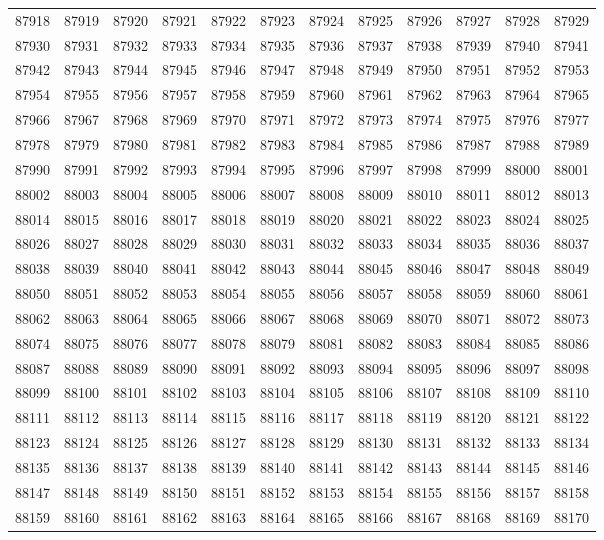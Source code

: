 \begin{center}
\begin{longtable}{llllllllllll}
87918 &87919 &87920 &87921 &87922 &87923 &87924 &87925 &87926 &87927 &87928 &87929 \\
87930 &87931 &87932 &87933 &87934 &87935 &87936 &87937 &87938 &87939 &87940 &87941 \\
87942 &87943 &87944 &87945 &87946 &87947 &87948 &87949 &87950 &87951 &87952 &87953 \\
87954 &87955 &87956 &87957 &87958 &87959 &87960 &87961 &87962 &87963 &87964 &87965 \\
87966 &87967 &87968 &87969 &87970 &87971 &87972 &87973 &87974 &87975 &87976 &87977 \\
87978 &87979 &87980 &87981 &87982 &87983 &87984 &87985 &87986 &87987 &87988 &87989 \\
87990 &87991 &87992 &87993 &87994 &87995 &87996 &87997 &87998 &87999 &88000 &88001 \\
88002 &88003 &88004 &88005 &88006 &88007 &88008 &88009 &88010 &88011 &88012 &88013 \\
88014 &88015 &88016 &88017 &88018 &88019 &88020 &88021 &88022 &88023 &88024 &88025 \\
88026 &88027 &88028 &88029 &88030 &88031 &88032 &88033 &88034 &88035 &88036 &88037 \\
88038 &88039 &88040 &88041 &88042 &88043 &88044 &88045 &88046 &88047 &88048 &88049 \\
88050 &88051 &88052 &88053 &88054 &88055 &88056 &88057 &88058 &88059 &88060 &88061 \\
88062 &88063 &88064 &88065 &88066 &88067 &88068 &88069 &88070 &88071 &88072 &88073 \\
88074 &88075 &88076 &88077 &88078 &88079 &88081 &88082 &88083 &88084 &88085 &88086 \\
88087 &88088 &88089 &88090 &88091 &88092 &88093 &88094 &88095 &88096 &88097 &88098 \\
88099 &88100 &88101 &88102 &88103 &88104 &88105 &88106 &88107 &88108 &88109 &88110 \\
88111 &88112 &88113 &88114 &88115 &88116 &88117 &88118 &88119 &88120 &88121 &88122 \\
88123 &88124 &88125 &88126 &88127 &88128 &88129 &88130 &88131 &88132 &88133 &88134 \\
88135 &88136 &88137 &88138 &88139 &88140 &88141 &88142 &88143 &88144 &88145 &88146 \\
88147 &88148 &88149 &88150 &88151 &88152 &88153 &88154 &88155 &88156 &88157 &88158 \\
88159 &88160 &88161 &88162 &88163 &88164 &88165 &88166 &88167 &88168 &88169 &88170 \\

\end{longtable}
\end{center}
